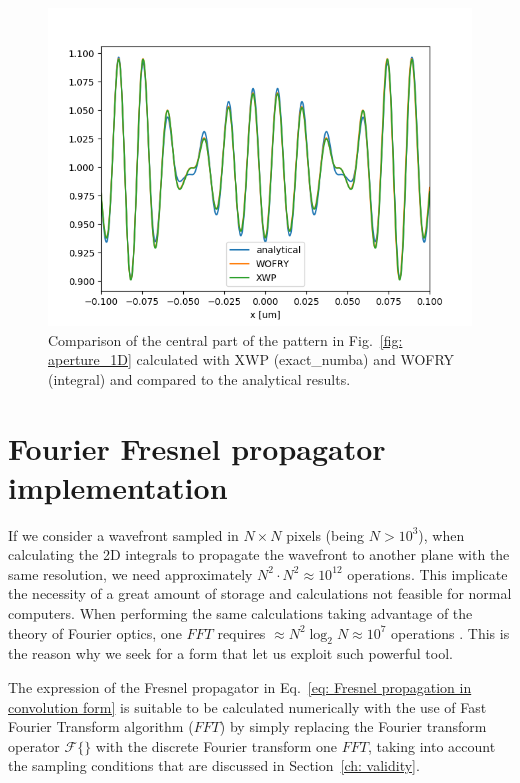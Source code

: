 \documentclass{iucr}              %
\begin{document}
\begin{figure}
\label{fig: aperture_1D_analytical}
\caption{Comparison of the central part of the pattern in Fig.~\ref{fig: aperture_1D} calculated with XWP (exact\_numba) and WOFRY (integral) and compared to the analytical results.
}
\includegraphics[width=1\textwidth]{aperture_1D_analytical.png}
\end{figure}


\section{Fourier Fresnel propagator implementation}
\label{ch: fourier-propagators}


If we consider a wavefront sampled in $N \times N$ pixels (being $N > 10^3$), when calculating the 2D integrals to propagate the wavefront to another plane with the same resolution, we need approximately $N^2\cdot N^2 \approx 10^{12}$ operations. This implicate the necessity of a great amount of storage and calculations not feasible for normal computers. When performing the same calculations taking advantage of the theory of Fourier optics, one $FFT$ requires $\approx N^2 \log_2 N \approx 10^7$ operations \cite{Marshall:1992:CVM:129191}. This is the reason why we seek for a form that let us exploit such powerful tool. 

The expression of the Fresnel propagator in Eq.~\ref{eq: Fresnel propagation in convolution form} is suitable to be calculated numerically with the use of Fast Fourier Transform algorithm ($FFT$) by simply replacing the Fourier transform operator $\mathcal{F}\big\{\big\}$ with the discrete Fourier transform one $FFT$, taking into account the sampling conditions that are discussed in Section~\ref{ch: validity}. 
\end{document}
